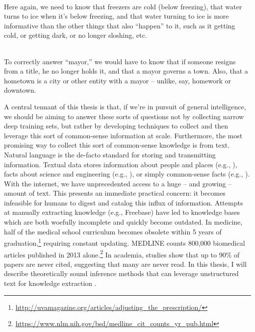 \begin{displayquote}
   \\
  Here again, we need to know that freezers are cold (below freezing), that water turns to ice
    when it's below freezing, and that water turning to ice is more informative than the other things
    that also ``happen'' to it, such as it getting cold, or getting dark, or no longer sloshing, etc.
\end{displayquote}

\begin{displayquote}
   \\
  To correctly answer ``mayor,'' we would have to know that if someone resigns from a title, he no longer
    holds it, and that a mayor governs a town.
  Also, that a hometown is a city or other entity with a mayor -- unlike, say, homework or downtown.
\end{displayquote}

%
%

A central tennant of this thesis is that, if we're in pursuit of general intelligence, we should be
  aiming to answer these sorts of questions not by collecting narrow deep training sets, but rather
  by developing techniques to collect and then leverage this sort of common-sense information at scale.
Furthermore, the most promising way to collect this sort of common-sense knowledge is from
  text.
Natural language is the de-facto standard for storing and transmitting 
  information. 
Textual data stores information about people and places (e.g., ), facts about science and engineering (e.g., ), 
  or simply common-sense facts (e.g., ). 
With the internet, we have unprecedented access to a huge -- and growing -- amount
  of text.
This presents an immediate practical concern: it becomes infeasible for
  humans to digest and catalog this influx of information.
Attempts at manually extracting knowledge (e.g., Freebase) have 
  led to knowledge bases which are both woefully incomplete and quickly become 
  outdated.
In medicine, half of the medical school curriculum becomes obsolete within 5 
  years of graduation,\footnote{
    \url{http://uvamagazine.org/articles/adjusting\_the\_prescription/}
  }
  requiring constant updating.
  MEDLINE counts 800,000 biomedical articles published in 2013 alone.\footnote{
    \url{https://www.nlm.nih.gov/bsd/medline\_cit\_counts\_yr\_pub.html}
  }
In academia, studies show that up to 90\% of papers are never 
  cited, suggesting that many are never read.
In this thesis, I will describe theoretically sound inference 
  methods that can leverage 
  unstructured text for knowledge extraction \cite{key:2014angeli-naturalli,key:2015angeli-openie}.

